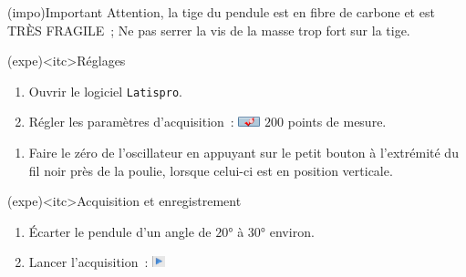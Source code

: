 \documentclass[../main/main.tex]{subfiles}
\begin{document}
\begin{tcb}(impo){Important}
	Attention, la tige du pendule est en fibre de carbone et est TRÈS FRAGILE~;
	Ne pas serrer la vis de la masse trop fort sur la tige.
\end{tcb}

\begin{tcb}[breakable](expe)<itc>{Réglages}
	\begin{enumerate}
		\item Ouvrir le logiciel \texttt{Latispro}.
		\item Régler les paramètres d'acquisition~:
		      \includegraphics[width=0.05\textwidth]{bouton1} $200$ points de mesure.
	\end{enumerate}
	\begin{enumerate}[resume]
		\item Faire le zéro de l'oscillateur en appuyant sur le petit bouton à
		      l'extrémité du fil noir près de la poulie, lorsque celui-ci est en
		      position verticale.
	\end{enumerate}
\end{tcb}

\begin{tcb}(expe)<itc>{Acquisition et enregistrement}
	\begin{enumerate}
		\item Écarter le pendule d'un angle de $\ang{20;;}$ à $\ang{30;;}$ environ.
		\item Lancer l'acquisition~: \includegraphics[width=0.03\textwidth]{bouton2}
	\end{enumerate}
\end{tcb}
\end{document}
